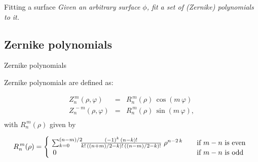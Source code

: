 \documentclass[xetex,10pt]{beamer}
\def\spacer{\vspace*{1em}}
\begin{document}
\begin{frame}[fragile]{Fitting a surface}
	\vfill
	\emph{Given an arbitrary surface $\phi$, fit a set of (Zernike) polynomials to it.}
	\vfill
\end{frame}

\subsection{Zernike polynomials}

\begin{frame}[fragile]{Zernike polynomials}
	
	Zernike polynomials are defined as:
	
	\[
	\begin{array}{lcl}
	Z^{\,m}_n(\rho,\varphi) &=& R^{\,m}_{n}(\rho)\,\cos(m\,\varphi) \! \\
	Z^{\,-\!m}_n(\rho,\varphi) &=& R^{\,m}_{n}(\rho)\,\sin(m\,\varphi), \! \\
  	\end{array}
	\]
	\pause 
	with $R^{\,m}_{n}(\rho)$ given by
	
	\[
	R^{\,m}_{n}(\rho) = \left\{
	\begin{array}{l l}
    \! \sum_{k=0}^{(n-m)/2} \!\!\! \frac{(-1)^k\,(n-k)!}{k!\,((n+m)/2-k)!\,((n-m)/2-k)!} \;\rho^{n-2\,k} & \quad \text{if $m-n$ is even}\\
    0 & \quad \text{if $m-n$ is odd}\\
  	\end{array} \right.
	\]
	\spacer

\end{frame}
\end{document}
